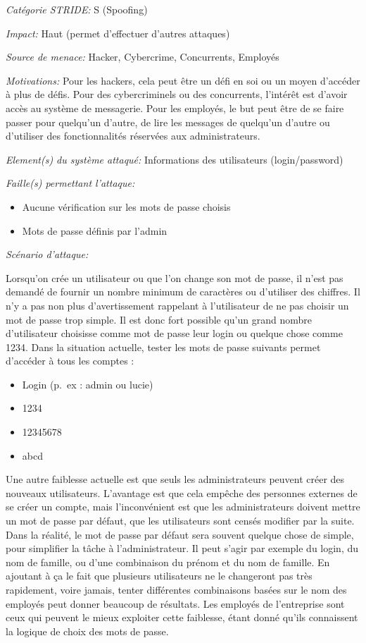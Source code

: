 \documentclass{article}
\begin{document}
\textit{Catégorie STRIDE:} S (Spoofing)

\textit{Impact:} Haut (permet d'effectuer d'autres attaques)

\textit{Source de menace:} Hacker, Cybercrime, Concurrents, Employés

\textit{Motivations:} Pour les hackers, cela peut être un défi en soi ou un moyen d'accéder à plus de défis. Pour des cybercriminels ou des concurrents, l'intérêt est d'avoir accès au système de messagerie. Pour les employés, le but peut être de se faire passer pour quelqu'un d'autre, de lire les messages de quelqu'un d'autre ou d'utiliser des fonctionnalités réservées aux administrateurs.

\textit{Element(s) du système attaqué:} Informations des utilisateurs
(login/password)

\textit{Faille(s) permettant l'attaque:} 

\begin{itemize}
	\item Aucune vérification sur les
	mots de passe choisis 
	\item Mots de passe définis par l'admin
\end{itemize}

\textit{Scénario d'attaque:}

Lorsqu'on crée un utilisateur ou que l'on change son mot de passe, il
n'est pas demandé de fournir un nombre minimum de caractères ou
d'utiliser des chiffres. Il n'y a pas non
plus d'avertissement rappelant à l'utilisateur de ne pas choisir un mot
de passe trop simple. Il est donc fort possible qu'un grand nombre
d'utilisateur choisisse comme mot de passe leur login ou quelque chose
comme 1234. Dans la situation actuelle, tester les mots de passe
suivants permet d'accéder à tous les comptes :
 
\begin{itemize}
	\item Login (p.~ex : admin ou
	lucie)
	\item 1234
	\item 12345678
	\item abcd
\end{itemize}

Une autre faiblesse actuelle est que seuls les administrateurs peuvent créer des nouveaux utilisateurs.
L'avantage est que cela empêche des personnes externes de se créer un
compte, mais l'inconvénient est que les administrateurs doivent mettre
un mot de passe par défaut, que les utilisateurs sont censés modifier
par la suite. Dans la réalité, le mot de passe par défaut sera souvent
quelque chose de simple, pour simplifier la tâche à l'administrateur. Il
peut s'agir par exemple du login, du nom de famille, ou d'une
combinaison du prénom et du nom de famille. En ajoutant à ça le fait que
plusieurs utilisateurs ne le changeront pas très rapidement, voire jamais,
tenter différentes combinaisons basées sur le nom des employés peut
donner beaucoup de résultats. Les employés de l'entreprise sont ceux qui
peuvent le mieux exploiter cette faiblesse, étant donné qu'ils
connaissent la logique de choix des mots de passe.\\
\end{document}
